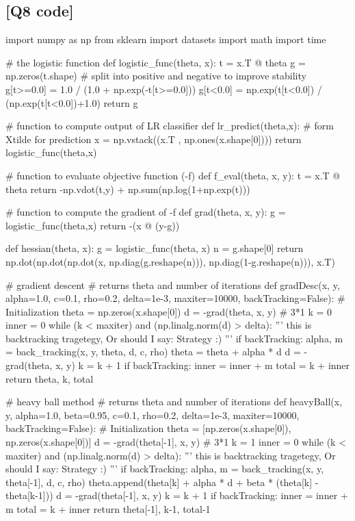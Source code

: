 \documentclass[12pt, a4 paper]{article}
\begin{document}
    \subsection{[Q8 code]}
        \begin{python} 
import numpy as np
from sklearn import datasets
import math
import time

# the logistic function
def logistic_func(theta, x):
    t = x.T @ theta
    g = np.zeros(t.shape)
    # split into positive and negative to improve stability
    g[t>=0.0] = 1.0 / (1.0 + np.exp(-t[t>=0.0])) 
    g[t<0.0] = np.exp(t[t<0.0]) / (np.exp(t[t<0.0])+1.0)
    return g

# function to compute output of LR classifier
def lr_predict(theta,x):
    # form Xtilde for prediction
    x = np.vstack((x.T , np.ones(x.shape[0])))
    return logistic_func(theta,x)

# function to evaluate objective function (-f)
def f_eval(theta, x, y):
    t = x.T @ theta
    return -np.vdot(t,y) + np.sum(np.log(1+np.exp(t)))

# function to compute the gradient of -f
def grad(theta, x, y):
    g = logistic_func(theta,x)
    return -(x @ (y-g))

def hessian(theta, x):
    g = logistic_func(theta, x)
    n = g.shape[0]
    return np.dot(np.dot(np.dot(x, np.diag(g.reshape(n))), np.diag(1-g.reshape(n))), x.T)
    
    
# gradient descent
# returns theta and number of iterations
def gradDesc(x, y, alpha=1.0, c=0.1, rho=0.2, delta=1e-3, maxiter=10000, backTracking=False):
    # Initialization
    theta = np.zeros(x.shape[0])
    d = -grad(theta, x, y) # 3*1
    k = 0
    inner = 0
    while (k < maxiter) and (np.linalg.norm(d) > delta):
        '''
        this is backtracking tragetegy, Or should I say: Strategy :)
        '''
        if backTracking:
            alpha, m = back_tracking(x, y, theta, d, c, rho)
        theta = theta + alpha * d
        d = -grad(theta, x, y)
        k = k + 1
        if backTracking:
            inner = inner + m
    total = k + inner
    return theta, k, total


# heavy ball method
# returns theta and number of iterations
def heavyBall(x, y, alpha=1.0, beta=0.95, c=0.1, rho=0.2, delta=1e-3, maxiter=10000, backTracking=False):
    # Initialization
    theta = [np.zeros(x.shape[0]), np.zeros(x.shape[0])]
    d = -grad(theta[-1], x, y) # 3*1
    k = 1
    inner = 0
    while (k < maxiter) and (np.linalg.norm(d) > delta):
        '''
        this is backtracking tragetegy, Or should I say: Strategy :)
        '''
        if backTracking:
            alpha, m = back_tracking(x, y, theta[-1], d, c, rho)      
        theta.append(theta[k] + alpha * d + beta * (theta[k] - theta[k-1]))
        d = -grad(theta[-1], x, y)
        k = k + 1
        if backTracking:
            inner = inner + m
    total = k + inner
    return theta[-1], k-1, total-1




\end{python}
\end{document}
